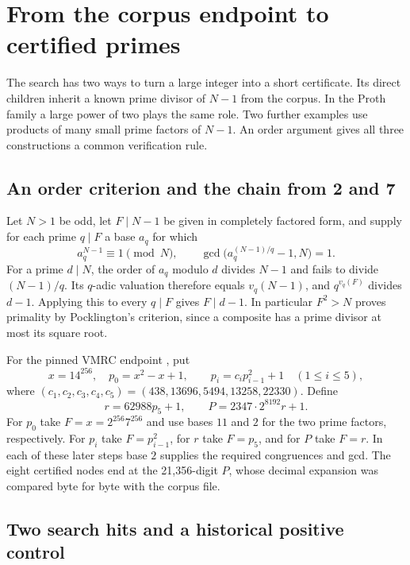 \documentclass[11pt,a4paper,oneside,openany]{report}
\begin{document}
\chapter{From the corpus endpoint to certified primes}
\label{cer:origins}

The search has two ways to turn a large integer into a short certificate. Its direct children inherit a known prime divisor of $N-1$ from the corpus. In the Proth family a large power of two plays the same role. Two further examples use products of many small prime factors of $N-1$. An order argument gives all three constructions a common verification rule.

\section{An order criterion and the chain from 2 and 7}

Let $N>1$ be odd, let $F\mid N-1$ be given in completely factored form, and supply for each prime $q\mid F$ a base $a_q$ for which
\begin{equation}
 a_q^{N-1}\equiv 1\pmod N,\qquad
 \gcd\bigl(a_q^{(N-1)/q}-1,N\bigr)=1 .
 \label{cer:pock}
\end{equation}
For a prime $d\mid N$, the order of $a_q$ modulo $d$ divides $N-1$ and fails to divide $(N-1)/q$. Its $q$-adic valuation therefore equals $v_q(N-1)$, and $q^{v_q(F)}$ divides $d-1$. Applying this to every $q\mid F$ gives $F\mid d-1$. In particular $F^2>N$ proves primality by Pocklington's criterion, since a composite has a prime divisor at most its square root.

For the pinned VMRC endpoint \cite{vmrc}, put
\[
 x=14^{256},\quad p_0=x^2-x+1,\qquad
 p_i=c_i p_{i-1}^2+1\quad(1\le i\le5),
\]
where $(c_1,c_2,c_3,c_4,c_5)=(438,13696,5494,13258,22330)$. Define
\[
 r=62988p_5+1,\qquad P=2347\cdot 2^{8192}r+1 .
\]
For $p_0$ take $F=x=2^{256}7^{256}$ and use bases $11$ and $2$ for the two prime factors, respectively. For $p_i$ take $F=p_{i-1}^2$, for $r$ take $F=p_5$, and for $P$ take $F=r$. In each of these later steps base $2$ supplies the required congruences and gcd. The eight certified nodes end at the 21,356-digit $P$, whose decimal expansion was compared byte for byte with the corpus file.

\section{Two search hits and a historical positive control}
\end{document}
